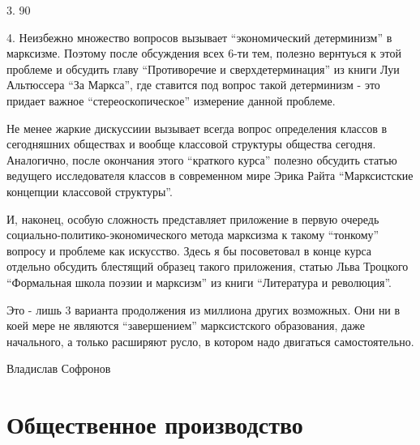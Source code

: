 \documentclass[12pt]{article}
\newcommand\resetparcount{%
  \setcounter{parcount}{0}
}
\newcounter{parcount}
\begin{document}
3. 90%


4. Неизбежно множество вопросов вызывает “экономический детерминизм” в марксизме. Поэтому после обсуждения всех 6-ти тем, полезно вернтуься к этой проблеме и обсудить главу “Противоречие и сверхдетерминация” из книги Луи Альтюссера “За Маркса”, где ставится под вопрос такой детерминизм - это придает важное “стереоскопическое” измерение данной проблеме.


Не менее жаркие дискуссиии вызывает всегда вопрос определения классов в сегодняшних обществах и вообще классовой структуры общества сегодня. Аналогично, после окончания этого “краткого курса” полезно обсудить статью ведущего исследователя классов в современном мире Эрика Райта “Марксистские концепции классовой структуры”.


И, наконец, особую сложность представляет приложение в первую очередь социально-политико-экономического метода марксизма к такому “тонкому” вопросу и проблеме как искусство. Здесь я бы посоветовал в конце курса отдельно обсудить блестящий образец такого приложения, статью Льва Троцкого “Формальная школа поэзии и марксизм” из книги “Литература и революция”.


Это - лишь 3 варианта продолжения из миллиона других возможных. Они ни в коей мере не являются “завершением” марксистского образования, даже начального, а только расширяют русло, в котором надо двигаться самостоятельно.

Владислав Софронов





\section{Общественное производство}
\resetparcount
\end{document}

